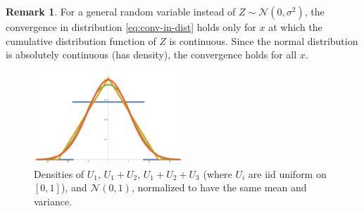 \documentclass[letterpaper,11pt,oneside,reqno]{article}
\numberwithin{equation}{section}
\theoremstyle{definition}
\newtheorem{remark}[proposition]{Remark}
\begin{document}
\begin{remark}
	For a general random variable instead of
	$Z\sim \mathcal{N}(0, \sigma^2)$, the convergence in distribution
	\eqref{eq:conv-in-dist} holds only for $x$ at which the cumulative distribution function of $Z$ is continuous.
	Since the normal distribution is absolutely continuous (has density), the convergence holds for all $x$.
\end{remark}
\begin{figure}[htpb]
	\centering
	\includegraphics[width=0.5\textwidth]{./pictures/uniform_pdfs.pdf}
	\caption{Densities of $U_1$, $U_1+U_2$, $U_1+U_2+U_3$ (where $U_i$ are iid uniform on $[0,1]$),
		and $\mathcal{N}(0,1)$,
		normalized to have the same mean and variance.}
	\label{fig:uniform_pdfs}
\end{figure}
\end{document}
